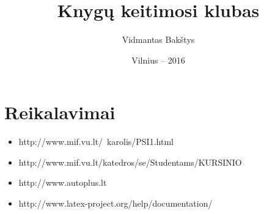 \documentclass{VUMIFPSkursinis}
\title{Knygų keitimosi klubas}
\author{Vidmantas Bakštys}
\date{Vilnius – 2016}
\begin{document}
\maketitle


\setcounter{tocdepth}{2}

\tableofcontents

\setcounter{secnumdepth}{0}

%
\setcounter{secnumdepth}{4}

\section{Reikalavimai}


\begin{itemize}
\item http://www.mif.vu.lt/~karolis/PSI1.html
\item http://www.mif.vu.lt/katedros/se/Studentams/KURSINIO%
\item http://www.autoplus.lt
\item http://www.latex-project.org/help/documentation/
\end{itemize}

\end{document}

